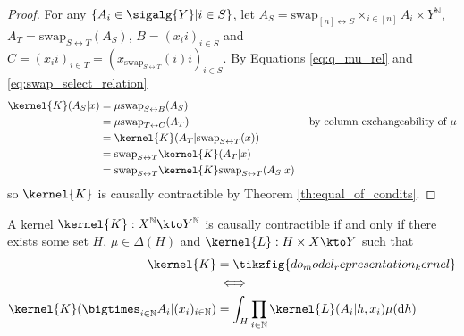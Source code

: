 \begin{proof}
For any $\{A_i\in\sigalg{Y}|i\in S\}$, let $A_S = \text{swap}_{[n]\leftrightarrow S} \times_{i\in [n]} A_i\times Y^{\mathbb{N}}$, $A_T = \text{swap}_{S\leftrightarrow T} (A_S)$, $B=(x_i i)_{i\in S}$ and $C=(x_i i)_{i\in T}=(x_{\text{swap}_{S\leftrightarrow T}}(i) i)_{i\in S}$. By Equations \ref{eq:q_mu_rel} and \ref{eq:swap_select_relation}
\begin{align}
    \kernel{K}(A_S|x) &= \mu \text{swap}_{S\leftrightarrow B} (A_S)\\
    &= \mu \text{swap}_{T\leftrightarrow C} (A_T)&\text{ by column exchangeability of }\mu\\
    &= \kernel{K}(A_T|\text{swap}_{S\leftrightarrow T}(x))\\
    &=  \text{swap}_{S\leftrightarrow T}\kernel{K}(A_T| x)\\
    &= \text{swap}_{S\leftrightarrow T} \kernel{K} \text{swap}_{S\leftrightarrow T} (A_S| x)
\end{align}
so $\kernel{K}$ is causally contractible by Theorem \ref{th:equal_of_condits}.
\end{proof}


\begin{theorem}\label{th:ciid_rep_kernel}
A kernel $\kernel{K}:X^{\mathbb{N}}\kto Y^{\mathbb{N}}$ is causally contractible if and only if there exists some set $H$, $\mu\in \Delta(H)$ and $\kernel{L}:H\times X\kto Y$ such that
\begin{align}
    \kernel{K} &= \tikzfig{do_model_representation_kernel}\\
    &\iff\\
    \kernel{K}(\bigtimes_{i\in\mathbb{N}}A_i|(x_i)_{i\in\mathbb{N}}) &= \int_H \prod_{i\in\mathbb{N}} \kernel{L}(A_i|h,x_i)\mu(\mathrm{d}h)
\end{align}
\end{theorem}

